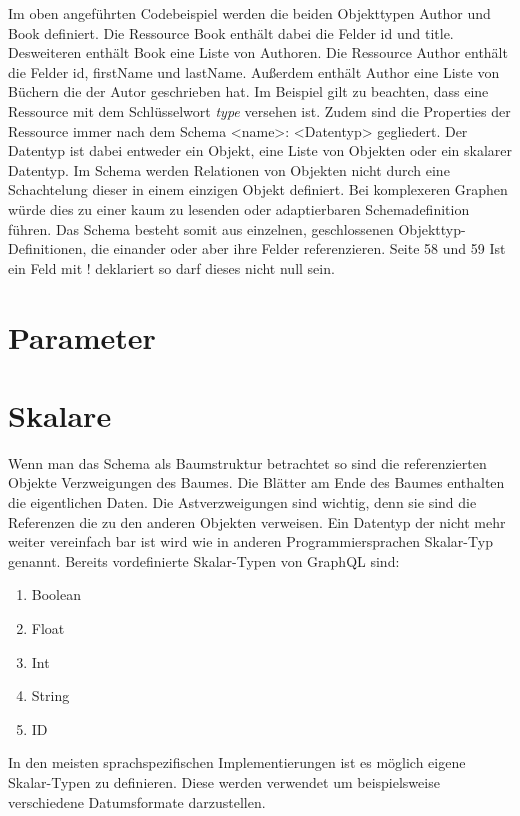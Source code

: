 \documentclass[bachelor, german ]{hgbthesis}
\begin{document}
Im oben angeführten Codebeispiel werden die beiden Objekttypen Author und Book definiert.
Die Ressource Book enthält dabei die Felder id und title. Desweiteren enthält Book eine Liste von Authoren.
Die Ressource Author enthält die Felder id, firstName und lastName.
Außerdem enthält Author eine Liste von Büchern die der Autor geschrieben hat.
Im Beispiel gilt zu beachten, dass eine Ressource mit dem Schlüsselwort \textit{type} versehen ist.
Zudem sind die Properties der Ressource immer nach dem Schema <name>: <Datentyp> gegliedert.
Der Datentyp ist dabei entweder ein Objekt, eine Liste von Objekten oder ein skalarer Datentyp.
Im Schema werden Relationen von Objekten nicht durch eine Schachtelung dieser in einem einzigen Objekt definiert.
Bei komplexeren Graphen würde dies zu einer kaum zu lesenden oder adaptierbaren Schemadefinition führen.
Das Schema besteht somit aus einzelnen, geschlossenen Objekttyp-Definitionen, die einander oder aber ihre Felder referenzieren. Seite 58 und 59
Ist ein Feld mit ! deklariert so darf dieses nicht null sein.


\section{Parameter}

\section{Skalare}

Wenn man das Schema als Baumstruktur betrachtet so sind die referenzierten Objekte Verzweigungen des Baumes.
Die Blätter am Ende des Baumes enthalten die eigentlichen Daten.
Die Astverzweigungen sind wichtig, denn sie sind die Referenzen die zu den anderen Objekten verweisen.
Ein Datentyp der nicht mehr weiter vereinfach bar ist wird wie in anderen Programmiersprachen Skalar-Typ genannt.
Bereits vordefinierte Skalar-Typen von GraphQL sind:

\begin{enumerate}
    \item Boolean
    \item Float
    \item Int
    \item String
    \item ID
\end{enumerate}
In den meisten sprachspezifischen Implementierungen ist es möglich eigene Skalar-Typen zu definieren. Diese werden verwendet um beispielsweise verschiedene Datumsformate darzustellen.
\end{document}
